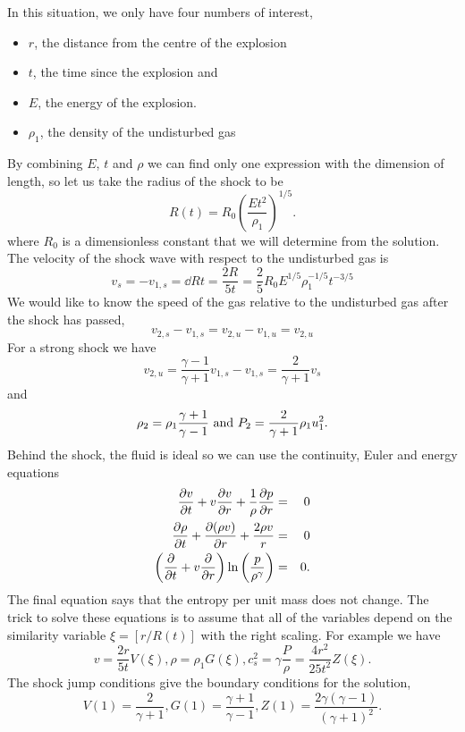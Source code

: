 In this situation, we only have four numbers of interest,
\begin{itemize}
\item $r$, the distance from the centre of the explosion
\item $t$, the time since the explosion and
\item $E$, the energy of the explosion.
\item $\rho_1$, the density of the undisturbed gas
\end{itemize}
By combining $E$, $t$ and $\rho$ we can find only one expression with
the dimension of length, so let us take the radius of the shock to be
\begin{equation}
R(t) =  R_0 \left ( \frac{E t^2}{\rho_1} \right )^{1/5}.
\label{eq:710}
\end{equation}
where $R_0$ is a dimensionless constant that we will determine from
the solution.  The velocity of the shock wave with respect to the
undisturbed gas is
\begin{equation}
v_s = -v_{1,s} = \dd{R}{t} = \frac{2R}{5t} = \frac{2}{5} R_0 E^{1/5}
\rho_1^{-1/5} t^{-3/5}
\label{eq:711}
\end{equation}
We would like to know the speed of the gas relative to the undisturbed
gas after the shock has passed,
\begin{equation}
v_{2,s} - v_{1,s}  = v_{2,u} - v_{1,u} = v_{2,u}
\label{eq:712}
\end{equation}
For a strong shock we have
\begin{equation}
v_{2,u} = \frac{\gamma-1}{\gamma+1} v_{1,s} - v_{1,s} =
\frac{2}{\gamma+1} v_s
\label{eq:713}
\end{equation}
and
\begin{equation}
\rho_2 = \rho_1 \frac{\gamma+1}{\gamma-1}~\hbox{\rm and}~P_2 =
\frac{2}{\gamma+1} \rho_1 u_1^2.
\label{eq:714}
\end{equation}
Behind the shock, the fluid is ideal so we can use the continuity,
Euler and energy equations
\begin{eqnarray}
\frac{\partial {v}}{\partial {t}} + v \frac{\partial {v}}{\partial {r}} +\frac{1}{\rho} \frac{\partial {p}}{\partial {r}} &=& 0 \\
\frac{\partial {\rho}}{\partial {t}} +  \frac{\partial {(\rho v)}}{\partial {r}} + \frac{2\rho v}{r} &=& 0 \\
\left ( \frac{\partial {}}{\partial {t}} + v \frac{\partial {}}{\partial {r}} \right ) 
\ln \left (\frac{p}{\rho^\gamma} \right ) &=& 0.
\label{eq:715}
\end{eqnarray}
The final equation says that the entropy per unit mass does not
change.
The trick to solve these equations is to assume that all of the
variables depend on the similarity variable $\xi = [ r/R(t) ]$ with
the right scaling.  For example we have
\begin{equation}
v = \frac{2r}{5t} V(\xi), \rho = \rho_1 G(\xi), c_s^2 = \gamma
\frac{P}{\rho} = \frac{4 r^2}{25 t^2} Z(\xi).
\label{eq:716}
\end{equation}
The shock jump conditions give the boundary conditions for the
solution,
\begin{equation}
V(1) = \frac{2}{\gamma+1}, G(1) = \frac{\gamma+1}{\gamma-1}, Z(1) =
\frac{2\gamma (\gamma-1)}{(\gamma+1)^2}.
\label{eq:717}
\end{equation}

